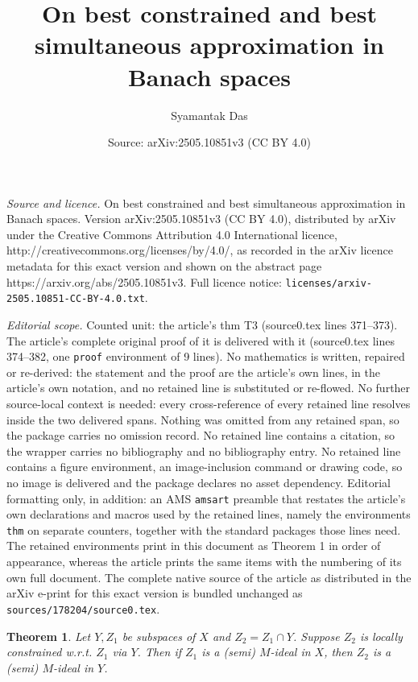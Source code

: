 \documentclass[10pt,a4paper]{amsart}
\title{On best constrained and best simultaneous approximation in Banach spaces}
\author{Syamantak Das}
\date{Source: arXiv:2505.10851v3 (CC BY 4.0)}
\newtheorem{thm}{Theorem}
\begin{document}
\maketitle

\noindent\emph{Source and licence.} On best constrained and best simultaneous approximation in Banach spaces. Version arXiv:2505.10851v3 (CC BY 4.0), distributed by arXiv under the Creative Commons Attribution 4.0 International licence, http://creativecommons.org/licenses/by/4.0/, as recorded in the arXiv licence metadata for this exact version and shown on the abstract page https://arxiv.org/abs/2505.10851v3. Full licence notice: \texttt{licenses/arxiv-2505.10851-CC-BY-4.0.txt}.\par\smallskip

\noindent\textit{Editorial scope.} Counted unit: the article's thm T3 (source0.tex lines 371--373). The article's complete original proof of it is delivered with it (source0.tex lines 374--382, one \texttt{proof} environment of 9 lines). No mathematics is written, repaired or re-derived: the statement and the proof are the article's own lines, in the article's own notation, and no retained line is substituted or re-flowed.  No further source-local context is needed: every cross-reference of every retained line resolves inside the two delivered spans.  Nothing was omitted from any retained span, so the package carries no omission record.  No retained line contains a citation, so the wrapper carries no bibliography and no bibliography entry.  No retained line contains a figure environment, an image-inclusion command or drawing code, so no image is delivered and the package declares no asset dependency.  Editorial formatting only, in addition: an AMS \texttt{amsart} preamble that restates the article's own declarations and macros used by the retained lines, namely the environments \texttt{thm} on separate counters, together with the standard packages those lines need.  The retained environments print in this document as Theorem 1 in order of appearance, whereas the article prints the same items with the numbering of its own full document.  The complete native source of the article as distributed in the arXiv e-print for this exact version is bundled unchanged as \texttt{sources/178204/source0.tex}.
\begin{thm}\label{T3}
Let $Y,Z_1$ be subspaces of $X$ and $Z_2=Z_1\cap Y$. Suppose $Z_2$ is locally constrained w.r.t. $Z_1$ via $Y$. Then if $Z_1$ is a (semi) $M$-ideal in $X$, then $Z_2$ is a (semi) $M$-ideal in $Y$.
\end{thm}
\end{document}
